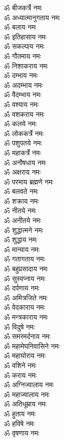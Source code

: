 \begin{multicols}{2}
\begin{flushleft}
ॐ बीजकर्त्रे नमः\\
ॐ अध्यात्मानुगताय नमः\\
ॐ बलाय नमः\\
ॐ इतिहासाय नमः\\
ॐ सकल्पाय नमः\\
ॐ गौतमाय नमः\hfill{}\\
ॐ निशाकराय नमः\\
ॐ दम्भाय नमः\\
ॐ अदम्भाय नमः\\
ॐ वैदम्भाय नमः\\
ॐ वश्याय नमः\\
ॐ वशकराय नमः\\
ॐ कलये नमः\\
ॐ लोककर्त्रे नमः\\
ॐ पशुपतये नमः\\
ॐ महाकर्त्रे नमः\hfill{}\\
ॐ अनौषधाय नमः\\
ॐ अक्षराय नमः\\
ॐ परमाय ब्रह्मणे नमः\\
ॐ बलवते नमः\\
ॐ शक्राय नमः\\
ॐ नीतये नमः\\
ॐ अनीतये नमः\\
ॐ शुद्धात्मने नमः\\
ॐ शुद्धाय नमः\\
ॐ मान्याय नमः\hfill{}\\
ॐ गतागताय नमः\\
ॐ बहुप्रसादाय नमः\\
ॐ सुस्वप्नाय नमः\\
ॐ दर्पणाय नमः\\
ॐ अमित्रजिते नमः\\
ॐ वेदकाराय नमः\\
ॐ मन्त्रकाराय नमः\\
ॐ विदुषे नमः\\
ॐ समरमर्दनाय नमः\\
ॐ महामेघनिवासिने नमः\hfill{}\\
ॐ महाघोराय नमः\\
ॐ वशिने नमः\\
ॐ कराय नमः\\
ॐ अग्निज्वालाय नमः\\
ॐ महाज्वालाय नमः\\
ॐ अतिधूम्राय नमः\\
ॐ हुताय नमः\\
ॐ हविषे नमः\\
ॐ वृषणाय नमः\\

\end{flushleft}
\end{multicols}
